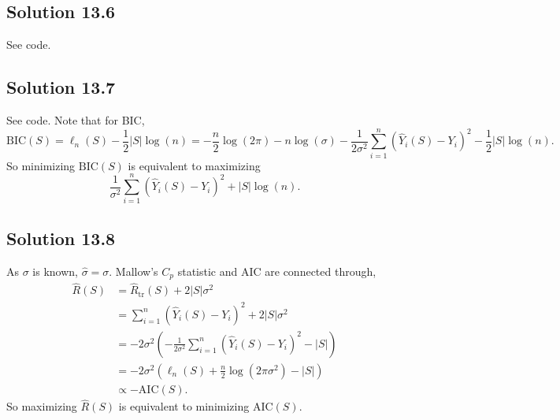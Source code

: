 \subsection*{Solution 13.6}

See code.


\subsection*{Solution 13.7}

See code.
Note that for BIC,
\begin{equation*}
    \mathrm{BIC}(S) = \ell_n(S) - \frac{1}{2}|S|\log(n)
        = -\frac{n}{2}\log(2\pi) - n\log(\sigma) - \frac{1}{2\sigma^2} \sum_{i = 1}^n (\hat{Y}_i(S) - Y_i)^2 - \frac{1}{2}|S| \log(n).
\end{equation*}
So minimizing $\mathrm{BIC}(S)$ is equivalent to maximizing
\begin{equation*}
    \frac{1}{\sigma^2}\sum_{i = 1}^n (\hat{Y}_i(S) - Y_i)^2 + |S|\log(n).
\end{equation*}


\subsection*{Solution 13.8}

As $\sigma$ is known, $\hat{\sigma} = \sigma$.
Mallow's $C_p$ statistic and AIC are connected through,
\begin{equation*}
    \begin{split}
        \hat{R}(S)
            &= \hat{R}_{\mathrm{tr}}(S) + 2|S|\sigma^2 \\
            &= \sum_{i = 1}^n (\hat{Y}_i(S) - Y_i)^2 + 2|S|\sigma^2 \\
            &= -2\sigma^2 \left( -\frac{1}{2\sigma^2} \sum_{i = 1}^n (\hat{Y}_i(S) - Y_i)^2 - |S| \right) \\
            &= -2\sigma^2 \left( \ell_n(S) + \frac{n}{2} \log(2\pi\sigma^2) - |S| \right) \\
            &\propto -\mathrm{AIC}(S).
    \end{split}
\end{equation*}
So maximizing $\hat{R}(S)$ is equivalent to minimizing $\mathrm{AIC}(S)$.
